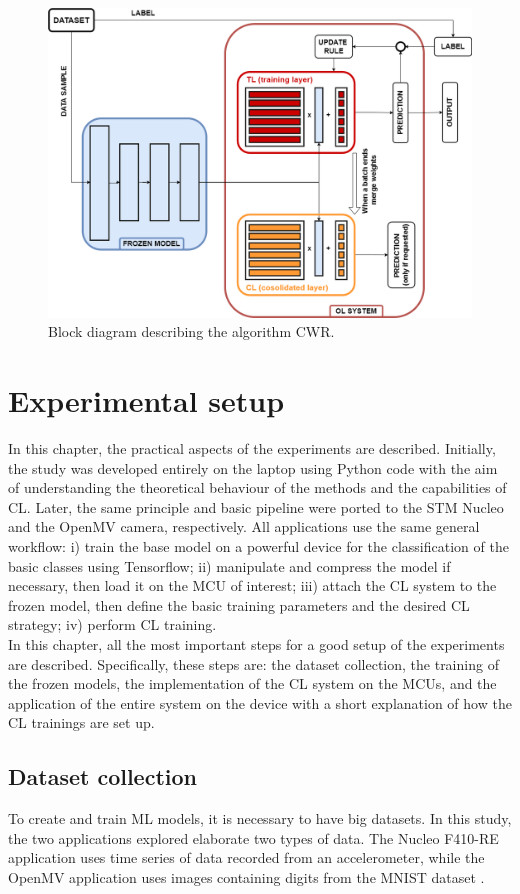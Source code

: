 \documentclass[12pt]{report}
\begin{document}
\begin{figure}[h!]
    \centering
    \includegraphics[width=120mm]{Figures/Chapter3/CWR.png} 
    \caption{Block diagram describing the algorithm CWR.}
    \label{fig:block_diag_CWR}    
\end{figure}

\chapter{Experimental setup}
In this chapter, the practical aspects of the experiments are described. Initially, the study was developed entirely on the laptop using Python code with the aim of understanding the theoretical behaviour of the methods and the capabilities of CL. Later, the same principle and basic pipeline were ported to the STM Nucleo and the OpenMV camera, respectively. All applications use the same general workflow: i) train the base model on a powerful device for the classification of the basic classes using Tensorflow; ii) manipulate and compress the model if necessary, then load it on the MCU of interest; iii) attach the CL system to the frozen model, then define the basic training parameters and the desired CL strategy; iv) perform CL training. \\
In this chapter, all the most important steps for a good setup of the experiments are described. Specifically, these steps are: the dataset collection, the training of the frozen models, the implementation of the CL system on the MCUs, and the application of the entire system on the device with a short explanation of how the CL trainings are set up.

\section{Dataset collection}
To create and train ML models, it is necessary to have big datasets. In this study, the two applications explored elaborate two types of data. The Nucleo F410-RE application uses time series of data recorded from an accelerometer, while the OpenMV application uses images containing digits from the MNIST dataset \cite{deng2012mnist}. \\
\end{document}
